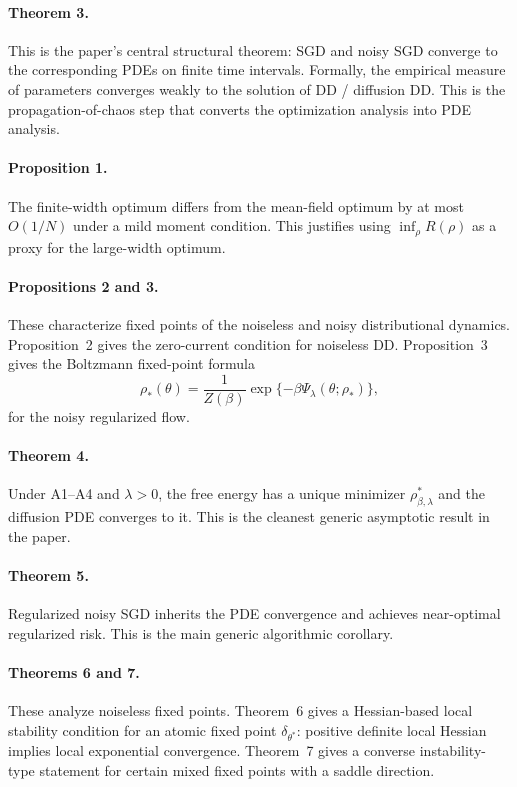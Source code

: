 \paragraph{Theorem 3.}
This is the paper's central structural theorem: SGD and noisy SGD converge to the corresponding PDEs on finite time intervals. Formally, the empirical measure of parameters converges weakly to the solution of DD / diffusion DD. This is the propagation-of-chaos step that converts the optimization analysis into PDE analysis.

\paragraph{Proposition 1.}
The finite-width optimum differs from the mean-field optimum by at most $O(1/N)$ under a mild moment condition. This justifies using $\inf_\rho R(\rho)$ as a proxy for the large-width optimum.

\paragraph{Propositions 2 and 3.}
These characterize fixed points of the noiseless and noisy distributional dynamics. Proposition~2 gives the zero-current condition for noiseless DD. Proposition~3 gives the Boltzmann fixed-point formula
\begin{equation}
\rho_*(\theta)=\frac{1}{Z(\beta)}\exp\{-\beta \Psi_\lambda(\theta;\rho_*)\},
\end{equation}
for the noisy regularized flow.

\paragraph{Theorem 4.}
Under A1--A4 and $\lambda>0$, the free energy has a unique minimizer $\rho_{\beta,\lambda}^*$ and the diffusion PDE converges to it. This is the cleanest generic asymptotic result in the paper.

\paragraph{Theorem 5.}
Regularized noisy SGD inherits the PDE convergence and achieves near-optimal regularized risk. This is the main generic algorithmic corollary.

\paragraph{Theorems 6 and 7.}
These analyze noiseless fixed points. Theorem~6 gives a Hessian-based local stability condition for an atomic fixed point $\delta_{\theta^*}$: positive definite local Hessian implies local exponential convergence. Theorem~7 gives a converse instability-type statement for certain mixed fixed points with a saddle direction.

